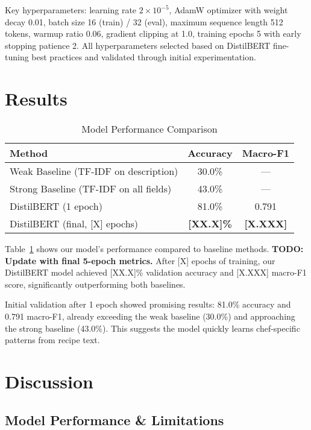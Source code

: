 \documentclass[twocolumn,10pt]{article}
\begin{document}
Key hyperparameters: learning rate $2 \times 10^{-5}$, AdamW optimizer with weight decay 0.01, batch size 16 (train) / 32 (eval), maximum sequence length 512 tokens, warmup ratio 0.06, gradient clipping at 1.0, training epochs 5 with early stopping patience 2. All hyperparameters selected based on DistilBERT fine-tuning best practices and validated through initial experimentation.

\section{Results}

\begin{table}[h]
\centering
\caption{Model Performance Comparison}
\begin{tabular}{lcc}
\hline
\textbf{Method} & \textbf{Accuracy} & \textbf{Macro-F1} \\
\hline
Weak Baseline (TF-IDF on description) & 30.0\% & --- \\
Strong Baseline (TF-IDF on all fields) & 43.0\% & --- \\
\hline
DistilBERT (1 epoch) & 81.0\% & 0.791 \\
DistilBERT (final, [X] epochs) & \textbf{[XX.X]\%} & \textbf{[X.XXX]} \\
\hline
\end{tabular}
\label{tab:results}
\end{table}

Table~\ref{tab:results} shows our model's performance compared to baseline methods. \textbf{TODO: Update with final 5-epoch metrics.} After [X] epochs of training, our DistilBERT model achieved [XX.X]\% validation accuracy and [X.XXX] macro-F1 score, significantly outperforming both baselines.

Initial validation after 1 epoch showed promising results: 81.0\% accuracy and 0.791 macro-F1, already exceeding the weak baseline (30.0\%) and approaching the strong baseline (43.0\%). This suggests the model quickly learns chef-specific patterns from recipe text.


\section{Discussion}

\subsection{Model Performance \& Limitations}
\end{document}

